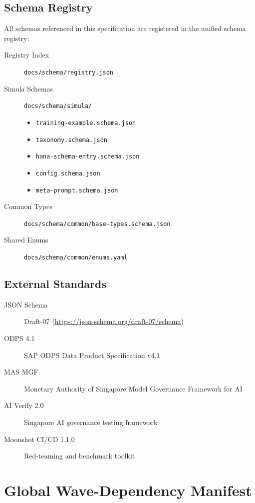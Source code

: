 \documentclass[12pt,a4paper,twoside]{report}
\begin{document}
\section{Schema Registry}

All schemas referenced in this specification are registered in the unified
schema registry:

\begin{description}
\item[Registry Index] \texttt{docs/schema/registry.json}
\item[Simula Schemas] \texttt{docs/schema/simula/}
\begin{itemize}
\item \texttt{training-example.schema.json}
\item \texttt{taxonomy.schema.json}
\item \texttt{hana-schema-entry.schema.json}
\item \texttt{config.schema.json}
\item \texttt{meta-prompt.schema.json}
\end{itemize}
\item[Common Types] \texttt{docs/schema/common/base-types.schema.json}
\item[Shared Enums] \texttt{docs/schema/common/enums.yaml}
\end{description}

\section{External Standards}

\begin{description}
\item[JSON Schema] Draft-07 (\url{https://json-schema.org/draft-07/schema})
\item[ODPS 4.1] SAP ODPS Data Product Specification v4.1
\item[MAS MGF] Monetary Authority of Singapore Model Governance Framework for AI
\item[AI Verify 2.0] Singapore AI governance testing framework
\item[Moonshot CI/CD 1.1.0] Red-teaming and benchmark toolkit
\end{description}

\chapter{Global Wave-Dependency Manifest}
\label{ch:global-dependencies}
\end{document}
